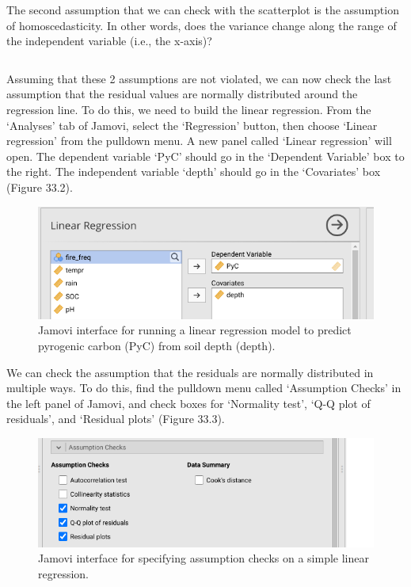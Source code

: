 \documentclass[
]{scrbook}
\begin{document}
The second assumption that we can check with the scatterplot is the assumption of homoscedasticity.
In other words, does the variance change along the range of the independent variable (i.e., the x-axis)?

\begin{verbatim}

\end{verbatim}

Assuming that these 2 assumptions are not violated, we can now check the last assumption that the residual values are normally distributed around the regression line.
To do this, we need to build the linear regression.
From the `Analyses' tab of Jamovi, select the `Regression' button, then choose `Linear regression' from the pulldown menu.
A new panel called `Linear regression' will open.
The dependent variable `PyC' should go in the `Dependent Variable' box to the right.
The independent variable `depth' should go in the `Covariates' box (Figure 33.2).

\begin{figure}
\includegraphics[width=1\linewidth]{img/Jamovi_linear_regression} \caption{Jamovi interface for running a linear regression model to predict pyrogenic carbon (PyC) from soil depth (depth).}\label{fig:unnamed-chunk-175}
\end{figure}

We can check the assumption that the residuals are normally distributed in multiple ways.
To do this, find the pulldown menu called `Assumption Checks' in the left panel of Jamovi, and check boxes for `Normality test', `Q-Q plot of residuals', and `Residual plots' (Figure 33.3).

\begin{figure}
\includegraphics[width=1\linewidth]{img/Jamovi_linear_regression_normality} \caption{Jamovi interface for specifying assumption checks on a simple linear regression.}\label{fig:unnamed-chunk-176}
\end{figure}
\end{document}
